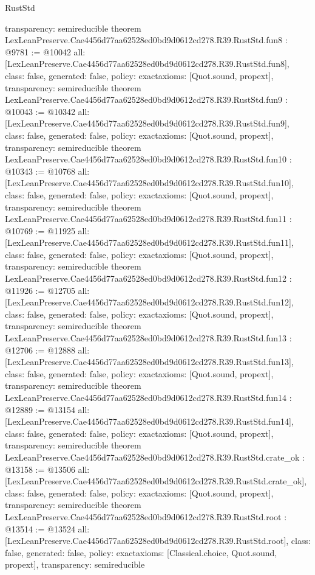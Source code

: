 \begin{lexlean}{RustStd}
\begin{coremodule}
{  transparency: semireducible
}
theorem LexLeanPreserve.Cae4456d77aa62528ed0bd9d0612cd278.R39.RustStd.fun8 : @9781 := @10042 {
  all: [LexLeanPreserve.Cae4456d77aa62528ed0bd9d0612cd278.R39.RustStd.fun8],
  class: false,
  generated: false,
  policy: exact{axioms: [Quot.sound, propext]},
  transparency: semireducible
}
theorem LexLeanPreserve.Cae4456d77aa62528ed0bd9d0612cd278.R39.RustStd.fun9 : @10043 := @10342 {
  all: [LexLeanPreserve.Cae4456d77aa62528ed0bd9d0612cd278.R39.RustStd.fun9],
  class: false,
  generated: false,
  policy: exact{axioms: [Quot.sound, propext]},
  transparency: semireducible
}
theorem LexLeanPreserve.Cae4456d77aa62528ed0bd9d0612cd278.R39.RustStd.fun10 : @10343 := @10768 {
  all: [LexLeanPreserve.Cae4456d77aa62528ed0bd9d0612cd278.R39.RustStd.fun10],
  class: false,
  generated: false,
  policy: exact{axioms: [Quot.sound, propext]},
  transparency: semireducible
}
theorem LexLeanPreserve.Cae4456d77aa62528ed0bd9d0612cd278.R39.RustStd.fun11 : @10769 := @11925 {
  all: [LexLeanPreserve.Cae4456d77aa62528ed0bd9d0612cd278.R39.RustStd.fun11],
  class: false,
  generated: false,
  policy: exact{axioms: [Quot.sound, propext]},
  transparency: semireducible
}
theorem LexLeanPreserve.Cae4456d77aa62528ed0bd9d0612cd278.R39.RustStd.fun12 : @11926 := @12705 {
  all: [LexLeanPreserve.Cae4456d77aa62528ed0bd9d0612cd278.R39.RustStd.fun12],
  class: false,
  generated: false,
  policy: exact{axioms: [Quot.sound, propext]},
  transparency: semireducible
}
theorem LexLeanPreserve.Cae4456d77aa62528ed0bd9d0612cd278.R39.RustStd.fun13 : @12706 := @12888 {
  all: [LexLeanPreserve.Cae4456d77aa62528ed0bd9d0612cd278.R39.RustStd.fun13],
  class: false,
  generated: false,
  policy: exact{axioms: [Quot.sound, propext]},
  transparency: semireducible
}
theorem LexLeanPreserve.Cae4456d77aa62528ed0bd9d0612cd278.R39.RustStd.fun14 : @12889 := @13154 {
  all: [LexLeanPreserve.Cae4456d77aa62528ed0bd9d0612cd278.R39.RustStd.fun14],
  class: false,
  generated: false,
  policy: exact{axioms: [Quot.sound, propext]},
  transparency: semireducible
}
theorem LexLeanPreserve.Cae4456d77aa62528ed0bd9d0612cd278.R39.RustStd.crate_ok : @13158 := @13506 {
  all: [LexLeanPreserve.Cae4456d77aa62528ed0bd9d0612cd278.R39.RustStd.crate_ok],
  class: false,
  generated: false,
  policy: exact{axioms: [Quot.sound, propext]},
  transparency: semireducible
}
theorem LexLeanPreserve.Cae4456d77aa62528ed0bd9d0612cd278.R39.RustStd.root : @13514 := @13524 {
  all: [LexLeanPreserve.Cae4456d77aa62528ed0bd9d0612cd278.R39.RustStd.root],
  class: false,
  generated: false,
  policy: exact{axioms: [Classical.choice, Quot.sound, propext]},
  transparency: semireducible
}


\end{coremodule}
\end{lexlean}
